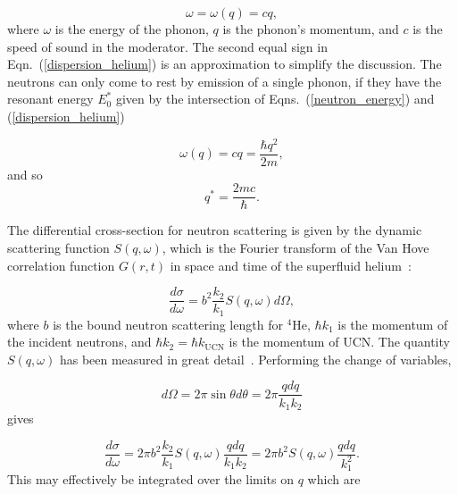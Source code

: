 \begin{equation}
\label{dispersion_helium}
\omega=\omega(q)= cq,
\end{equation}
where $\omega$ is the energy of the phonon, $q$ is the phonon's
momentum, and $c$ is the speed of sound in the moderator. The second
equal sign in Eqn.~(\ref{dispersion_helium}) is an approximation to
simplify the discussion. The neutrons can only come to rest by
emission of a single phonon, if they have the resonant energy $E_0^*$
given by the intersection of Eqns.~(\ref{neutron_energy}) and
(\ref{dispersion_helium})

\begin{equation}
\omega(q)=cq=\frac{\hbar q^2}{2m},
\end{equation}
and so
\begin{equation}
q^*=\frac{2mc}{\hbar}.
\end{equation}


The differential cross-section for neutron scattering is given by the
dynamic scattering function $S(q,\omega)$, which is the Fourier
transform of the Van Hove correlation function $G(r,t)$ in space and
time of the superfluid helium~\cite{Squires}:

\begin{equation}
\frac{d\sigma}{d\omega}=b^2 \frac{k_2}{k_1}S(q,\omega) d\Omega,
\end{equation}
where $b$ is the bound neutron scattering length for $^4$He,
$\hbar k_1$ is the momentum of the incident neutrons, and
$\hbar k_2=\hbar k_{\text{UCN}}$ is the momentum of UCN. The quantity
$S(q,\omega)$ has been measured in great
detail~\cite{S_func1,gibbs1999collective,S_func3}. Performing the
change of variables,

\begin{equation}
d\Omega=2 \pi \sin \theta d \theta = 2 \pi \frac{q dq}{k_1 k_2}
\end{equation}
gives

\begin{equation}
 \frac{d\sigma}{d\omega}=2\pi b^2 \frac{k_2}{k_1}S(q,\omega)\frac{q
   dq}{k_1 k_2}=2\pi b^2 S(q,\omega)\frac{q dq}{k_1^2}.
\end{equation}
This may effectively be integrated over the limits on $q$ which are

